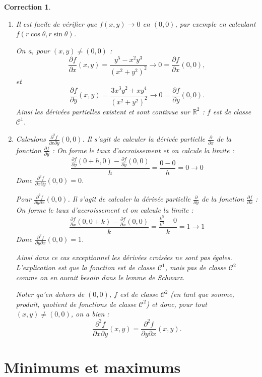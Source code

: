 \documentclass[11pt,a4paper]{article}
\newcommand{\Rr}{\mathbb{R}} \newcommand{\R}{\mathbb{R}}
\theoremstyle{exostyle}
\newtheorem{cor}{Correction}
\newcommand{\correction}{\begin{cor}} \newcommand{\fincorrection}{\end{cor}}
\begin{document}
\correction
\begin{enumerate}
	\item 
	Il est facile de vérifier que $f(x,y) \to 0$ en $(0,0)$, par exemple en calculant $f(r\cos\theta,r\sin\theta)$.
	
	On a, pour $(x,y) \neq (0,0)$ :
	\[
	\frac{\partial f}{\partial x}(x,y) = \frac{y^5-x^2y^3}{(x^2+y^2)^2} \longrightarrow 0 = \frac{\partial f}{\partial x}(0,0),\]
	et
	\[
	\frac{\partial f}{\partial y}(x,y) = \frac{3x^3y^2 + xy^4}{(x^2+y^2)^2} \longrightarrow 0 = \frac{\partial f}{\partial y}(0,0).\]
	Ainsi les dérivées partielles existent et sont continue sur $\Rr^2$ : $f$ est de classe $\mathcal{C}^1$.
	
	\item 
	Calculons $\frac{\partial^2 f}{\partial x \partial y}(0,0)$.
	Il s'agit de calculer la dérivée partielle $\frac{\partial }{\partial x}$ de la fonction $\frac{\partial f}{\partial y}$ :
	On forme le taux d'accroissement et on calcule la limite :
	\[
	\frac{\frac{\partial f}{\partial y}(0+h,0) - \frac{\partial f}{\partial y}(0,0)}{h}
	= \frac{0-0}{h} = 0 \to 0\]
	Donc $\frac{\partial^2 f}{\partial x \partial y}(0,0)=0$.
	
	Pour $\frac{\partial^2 f}{\partial y \partial x}(0,0)$.
	Il s'agit de calculer la dérivée partielle $\frac{\partial }{\partial y}$ de la fonction $\frac{\partial f}{\partial x}$ :
	On forme le taux d'accroissement et on calcule la limite :
	\[
	\frac{\frac{\partial f}{\partial x}(0,0+k) - \frac{\partial f}{\partial x}(0,0)}{k}
	= \frac{\frac{k^5}{k^4}-0}{k} = 1 \to 1\]
	Donc $\frac{\partial^2 f}{\partial y \partial x}(0,0)=1$.
	
	Ainsi dans ce cas exceptionnel les dérivées croisées ne sont pas égales.
	L'explication est que la fonction est de classe $\mathcal{C}^1$, mais pas de classe $\mathcal{C}^2$ comme on en aurait besoin dans le lemme de Schwarz.
	
	Noter qu'en dehors de $(0,0)$, $f$ est de classe $\mathcal{C}^2$ (en tant que somme, produit, quotient de fonctions de classe $\mathcal{C}^2$) et donc, pour tout $(x,y) \neq (0,0)$, on a bien :
	\[
	\frac{\partial^2 f}{\partial x \partial y}(x,y) = \frac{\partial^2 f}{\partial y \partial x}(x,y).
	\]
\end{enumerate}
\fincorrection

\finexercice





\section{Minimums et maximums}
\end{document}
